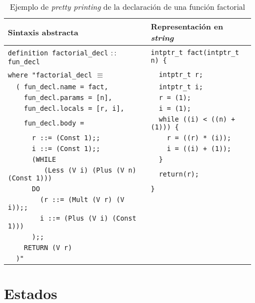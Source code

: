 \begin{table}[h!]
\centering
\begin{tabular}{|l|l|}
  \hline
  \textbf{Sintaxis abstracta} & \textbf{Representación en \textit{string}} \\ [0.5ex]
  \hline \hline
  \verb|definition factorial_decl| $::$ \verb|fun_decl|  & \verb|intptr_t fact(intptr_t n) {| \\
  \verb|where "factorial_decl| $\equiv$                  & \verb|  intptr_t r;| \\
  \verb|  ( fun_decl.name = fact,|                       & \verb|  intptr_t i;| \\
  \verb|    fun_decl.params = [n],|                      & \verb|  r = (1);| \\
  \verb|    fun_decl.locals = [r, i],|                   & \verb|  i = (1);| \\
  \verb|    fun_decl.body =|                             & \verb|  while ((i) < ((n) + (1))) {| \\
  \verb|      r ::= (Const 1);;|                         & \verb|    r = ((r) * (i));| \\
  \verb|      i ::= (Const 1);;|                         & \verb|    i = ((i) + (1));| \\
  \verb|      (WHILE|                                    & \verb|  }| \\
  \verb|         (Less (V i) (Plus (V n) (Const 1)))|    & \verb|  return(r);| \\
  \verb|      DO|                                        & \verb|}| \\
  \verb|        (r ::= (Mult (V r) (V i));;|             & \\
  \verb|        i ::= (Plus (V i) (Const 1)))|           & \\
  \verb|      );;|                                       & \\
  \verb|    RETURN (V r)|                                & \\
  \verb|  )"|                                            & \\
  \hline
\end{tabular}

\caption{Ejemplo de \textit{pretty printing} de la declaración de una función factorial}
\label{tab:pretty_function_fact}
\end{table}


\section{Estados}

